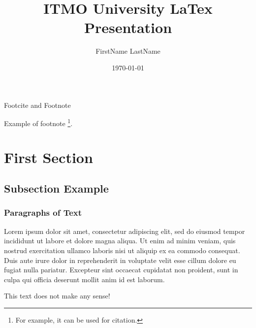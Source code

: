 \documentclass[aspectratio=169]{beamer}
\title[ITMO LaTex]{ITMO University LaTex Presentation}
\author[LastName F.]{FirstName LastName}
\date{\today}
\begin{document}


\begin{frame}[plain]
    \titlepage
\end{frame}



\begin{frame}[plain]
\end{frame}





\begin{frame}{Footcite and Footnote}

Example of footnote \footnote{For example, it can be used for citation.}.

\end{frame}



\section{First Section}

\subsection{Subsection Example} 

\begin{frame}
\frametitle{Paragraphs of Text}
Lorem ipsum dolor sit amet, consectetur adipiscing elit, sed do eiusmod tempor incididunt ut labore et dolore magna aliqua. Ut enim ad minim veniam, quis nostrud exercitation ullamco laboris nisi ut aliquip ex ea commodo consequat. Duis aute irure dolor in reprehenderit in voluptate velit esse cillum dolore eu fugiat nulla pariatur. Excepteur sint occaecat cupidatat non proident, sunt in culpa qui officia deserunt mollit anim id est laborum.

\alert{This text does not make any sense!}

\end{frame}
\end{document}
